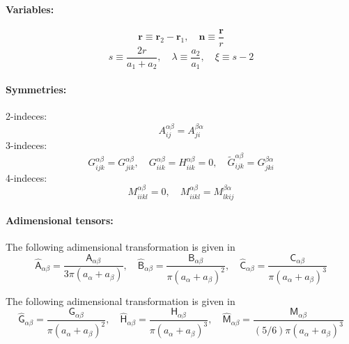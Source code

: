 \documentclass[12pt]{article}
\newcommand{\tens}[1]{\bm{\mathsf{#1}}}
\begin{document}
\paragraph{Variables:}
\begin{equation}
 \bm{r} \equiv \bm{r}_2 - \bm{r}_1, 
\quad
 \bm{n} \equiv \frac{\bm{r}}{r}
\end{equation}
\begin{equation}
  s \equiv \frac{2r}{a_{1}+ a_{2}}, \quad
 \lambda \equiv \frac{a_2}{a_1}, \quad
\xi \equiv s - 2
\end{equation}



\paragraph{Symmetries:}
2-indeces:
\begin{equation}
 A_{ij}^{\alpha\beta} =  A_{ji}^{\beta\alpha}
\end{equation}
3-indeces:
\begin{equation}
 G_{ijk}^{\alpha\beta} =   G_{jik}^{\alpha\beta} , \quad 
 G_{iik}^{\alpha\beta} =   H_{iik}^{\alpha\beta}  = 0, \quad 
 \tilde{G}_{ijk}^{\alpha\beta}  =  G_{jki}^{\beta\alpha} 
\end{equation}
4-indeces:
\begin{equation}
 M_{iikl}^{\alpha\beta} = 0,
\quad 
 M_{iikl}^{\alpha\beta} =  M_{lkij}^{\beta\alpha} 
\end{equation}

\paragraph{Adimensional tensors:}

The following adimensional transformation is given in \citet{Jeffrey_1984}
\begin{equation}
 \hat{\tens{A}}_{\alpha\beta}
= \frac{\tens{A}_{\alpha\beta}}{3\pi(a_{\alpha} + a_{\beta})},
\quad
 \hat{\tens{B}}_{\alpha\beta}
= \frac{\tens{B}_{\alpha\beta}}{\pi(a_{\alpha}+ a_{\beta})^2},
\quad
 \hat{\tens{C}}_{\alpha\beta}
= \frac{\tens{C}_{\alpha\beta}}{\pi(a_{\alpha}+ a_{\beta})^3}
\end{equation}

The following adimensional transformation is given in \citet{Jeffrey_1992}
\begin{equation}
 \hat{\tens{G}}_{\alpha\beta}
= \frac{\tens{G}_{\alpha\beta}}{\pi(a_{\alpha} + a_{\beta})^2},
\quad
 \hat{\tens{H}}_{\alpha\beta}
= \frac{\tens{H}_{\alpha\beta}}{\pi(a_{\alpha}+ a_{\beta})^3},
\quad
 \hat{\tens{M}}_{\alpha\beta}
= \frac{\tens{M}_{\alpha\beta}}{(5/6)\pi(a_{\alpha}+ a_{\beta})^3}
\end{equation}
\end{document}
